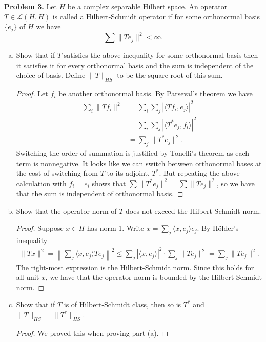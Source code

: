 \documentclass[11pt,letterpaper]{report}
\newcommand{\mcal}[1]{\mathcal{#1}}
\begin{document}
\noindent\textbf{Problem 3. }Let $H$ be a complex separable Hilbert space. An operator $T\in \mcal{L}(H, H)$ is called a Hilbert-Schmidt operator if for some orthonormal basis $\{e_j\}$ of $H$ we have
\[
\sum \|Te_j\|^2<\infty.
\]
\begin{enumerate}[(a)]
	\item Show that if $T$ satisfies the above inequality for some orthonormal basis then it satisfies it for every orthonormal basis and the sum is independent of the choice of basis. Define $\|T\|_{HS}$ to be the square root of this sum.
	\begin{proof}
		Let $f_i$ be another orthonormal basis. By Parseval's theorem we have
		\begin{align*}
			\sum_i \|Tf_i\|^2 &= \sum_i\sum_j|\langle Tf_i, e_j\rangle|^2\\
			&= \sum_i\sum_j|\langle T^*e_j, f_i\rangle|^2\\
			&= \sum_j\|T^*e_j\|^2.
		\end{align*}
		Switching the order of summation is justified by Tonelli's theorem as each term is nonnegative. It looks like we can switch between orthonormal bases at the cost of switching from $T$ to its adjoint, $T^*$. But repeating the above calculation with $f_i = e_i$ shows that $\sum \|T^*e_j\|^2 = \sum \|Te_j\|^2$, so we have that the sum is independent of orthonormal basis.
	\end{proof}

	\item Show that the operator norm of $T$ does not exceed the Hilbert-Schmidt norm.
	\begin{proof}
		Suppose $x\in H$ has norm 1. Write $x = \sum_j \langle x, e_j\rangle e_j$. By H\"older's inequality
		\begin{align*}
			\|Tx\|^2 = \left\|\sum_j\langle x, e_j\rangle Te_j\right\|^2 \leq \sum_j|\langle x, e_j\rangle|^2\cdot \sum_j\|Te_j\|^2 = \sum_j\|Te_j\|^2.
		\end{align*}
		The right-most expression is the Hilbert-Schmidt norm. Since this holds for all unit $x$, we have that the operator norm is bounded by the Hilbert-Schmidt norm.
	\end{proof}

	\item Show that if $T$ is of Hilbert-Schmidt class, then so is $T^*$ and $\|T\|_{HS} = \|T^*\|_{HS}$.
	\begin{proof}
		We proved this when proving part (a).
	\end{proof}


\end{enumerate}
\end{document}
